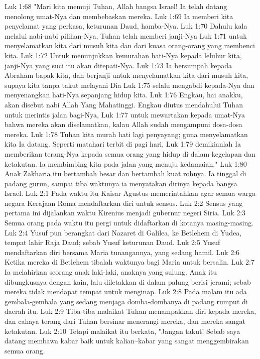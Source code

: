 Luk 1:68  "Mari kita memuji Tuhan, Allah bangsa Israel! Ia telah datang menolong umat-Nya dan membebaskan mereka.
Luk 1:69  Ia memberi kita penyelamat yang perkasa, keturunan Daud, hamba-Nya.
Luk 1:70  Dahulu kala melalui nabi-nabi pilihan-Nya, Tuhan telah memberi janji-Nya
Luk 1:71  untuk menyelamatkan kita dari musuh kita dan dari kuasa orang-orang yang membenci kita.
Luk 1:72  Untuk menunjukkan kemurahan hati-Nya kepada leluhur kita, janji-Nya yang suci itu akan ditepati-Nya.
Luk 1:73  Ia bersumpah kepada Abraham bapak kita, dan berjanji untuk menyelamatkan kita dari musuh kita, supaya kita tanpa takut melayani Dia
Luk 1:75  selalu mengabdi kepada-Nya dan menyenangkan hati-Nya sepanjang hidup kita.
Luk 1:76  Engkau, hai anakku, akan disebut nabi Allah Yang Mahatinggi. Engkau diutus mendahului Tuhan untuk merintis jalan bagi-Nya,
Luk 1:77  untuk mewartakan kepada umat-Nya bahwa mereka akan diselamatkan, kalau Allah sudah mengampuni dosa-dosa mereka.
Luk 1:78  Tuhan kita murah hati lagi penyayang; guna menyelamatkan kita Ia datang. Seperti matahari terbit di pagi hari,
Luk 1:79  demikianlah Ia memberikan terang-Nya kepada semua orang yang hidup di dalam kegelapan dan ketakutan. Ia membimbing kita pada jalan yang menuju kedamaian."
Luk 1:80  Anak Zakharia itu bertambah besar dan bertambah kuat rohnya. Ia tinggal di padang gurun, sampai tiba waktunya ia menyatakan dirinya kepada bangsa Israel.
Luk 2:1  Pada waktu itu Kaisar Agustus memerintahkan agar semua warga negara Kerajaan Roma mendaftarkan diri untuk sensus.
Luk 2:2  Sensus yang pertama ini dijalankan waktu Kirenius menjadi gubernur negeri Siria.
Luk 2:3  Semua orang pada waktu itu pergi untuk didaftarkan di kotanya masing-masing.
Luk 2:4  Yusuf pun berangkat dari Nazaret di Galilea, ke Betlehem di Yudea, tempat lahir Raja Daud; sebab Yusuf keturunan Daud.
Luk 2:5  Yusuf mendaftarkan diri bersama Maria tunangannya, yang sedang hamil.
Luk 2:6  Ketika mereka di Betlehem tibalah waktunya bagi Maria untuk bersalin.
Luk 2:7  Ia melahirkan seorang anak laki-laki, anaknya yang sulung. Anak itu dibungkusnya dengan kain, lalu diletakkan di dalam palung berisi jerami; sebab mereka tidak mendapat tempat untuk menginap.
Luk 2:8  Pada malam itu ada gembala-gembala yang sedang menjaga domba-dombanya di padang rumput di daerah itu.
Luk 2:9  Tiba-tiba malaikat Tuhan menampakkan diri kepada mereka, dan cahaya terang dari Tuhan bersinar menerangi mereka, dan mereka sangat ketakutan.
Luk 2:10  Tetapi malaikat itu berkata, "Jangan takut! Sebab saya datang membawa kabar baik untuk kalian--kabar yang sangat menggembirakan semua orang.
